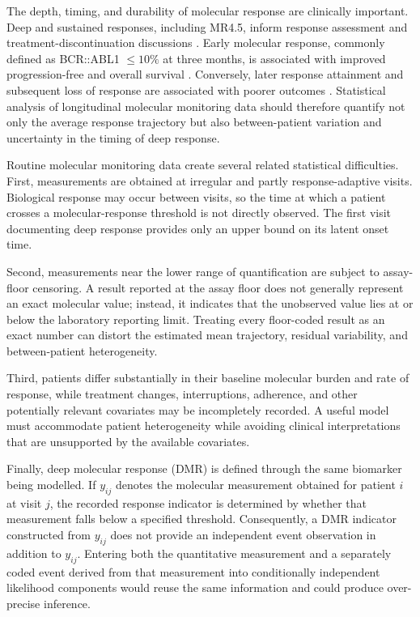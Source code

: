 \documentclass[11pt]{article}
\begin{document}
The depth, timing, and durability of molecular response are clinically important. Deep and sustained responses, including MR4.5, inform response assessment and treatment-discontinuation discussions
\cite{Hughes2014EarlyMolecularResponse,Rasekh2026TFRPredictor,Ono2026MR45,Takahashi2026JSKI}. Early molecular response, commonly defined as BCR::ABL1 $\leq 10\%$ at three months, is associated with improved progression-free and overall survival
\cite{Hanfstein2012EMR,Ohm2012Landmark}. Conversely, later response attainment and subsequent loss of response are associated with poorer outcomes
\cite{Li2014TKIEfficacy}. Statistical analysis of longitudinal molecular monitoring data should therefore quantify not only the average response trajectory but also between-patient variation and uncertainty in the timing of deep response.

Routine molecular monitoring data create several related statistical difficulties. First, measurements are obtained at irregular and partly response-adaptive visits. Biological response may occur between visits, so the time at which a patient crosses a molecular-response threshold is not directly observed. The first visit documenting deep response provides only an upper bound on its latent onset time.

Second, measurements near the lower range of quantification are subject to assay-floor censoring. A result reported at the assay floor does not generally represent an exact molecular value; instead, it indicates that the unobserved value lies at or below the laboratory reporting limit. Treating every floor-coded result as an exact number can distort the estimated mean trajectory, residual variability, and between-patient heterogeneity.

Third, patients differ substantially in their baseline molecular burden and rate of response, while treatment changes, interruptions, adherence, and other potentially relevant covariates may be incompletely recorded. A useful model must accommodate patient heterogeneity while avoiding clinical interpretations that are unsupported by the available covariates.

Finally, deep molecular response (DMR) is defined through the same biomarker being modelled. If $y_{ij}$ denotes the molecular measurement obtained for patient $i$ at visit $j$, the recorded response indicator is determined by whether that measurement falls below a specified threshold. Consequently, a DMR indicator constructed from $y_{ij}$ does not provide an independent event observation in addition to $y_{ij}$. Entering both the quantitative measurement and a separately coded event derived from that measurement into conditionally independent likelihood components would reuse the same information and could produce over-precise inference.
\end{document}
